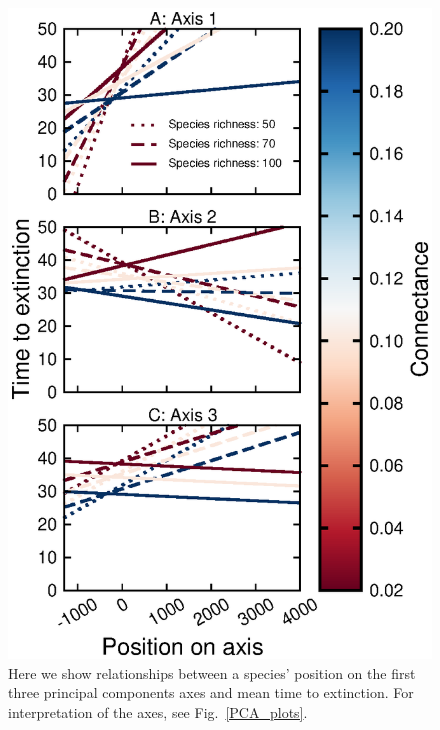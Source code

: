 \documentclass[12pt]{article}
\begin{document}
	\begin{figure}[h!]
		\caption{Here we show relationships between a species' position on the first three principal components axes and mean time to extinction. For interpretation of the axes, see Fig.~\ref{PCA_plots}.}
		\label{PCA_lmers}
		\includegraphics[height=0.75\textheight]{figures/extinction_order/PCA_position_lmer_summary_paper_full.eps}
		\end{figure}
\end{document}
